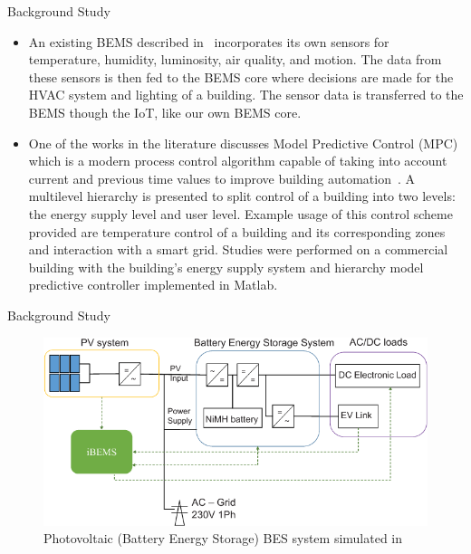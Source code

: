 \documentclass{beamer}
\begin{document}
\begin{frame}{Background Study}{}
    \begin{itemize} %
        \item An existing BEMS described in~\cite{Mataloto2019} incorporates its own sensors for temperature, humidity, luminosity, air quality, and motion. The data from these sensors is then fed to the BEMS core where decisions are made for the HVAC system and lighting of a building. The sensor data is transferred to the BEMS though the IoT, like our own BEMS core.
        \item One of the works in the literature discusses Model Predictive Control (MPC) which is a modern process control algorithm capable of taking into account current and previous time values to improve building automation~\cite{Mayer2017}. A multilevel hierarchy is presented to split control of a building into two levels: the energy supply level and user level. Example usage of this control scheme provided are temperature control of a building and its corresponding zones and interaction with a smart grid. Studies were performed on a commercial building with the building's energy supply system and hierarchy model predictive controller implemented in Matlab.
    \end{itemize}
\end{frame}

\begin{frame}{Background Study}{}
\begin{figure}
    \centering
    \includegraphics[scale=0.45]{figs/img/pvBESSystem.png}
    \caption{Photovoltaic (Battery Energy Storage) BES system simulated in \cite{Barchi2018}}
    \label{fig:pvBESSystem}
\end{figure}
\end{frame}
\end{document}
